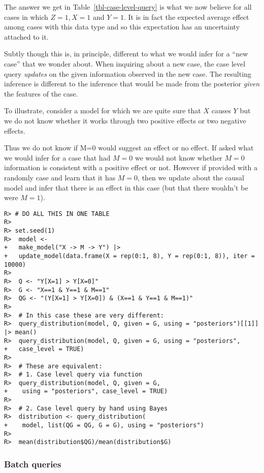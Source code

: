 \documentclass[
  11pt,
  article]{jss}
\begin{document}
The answer we get in Table~\ref{tbl-case-level-query} is what we now
believe for all cases in which \(Z=1, X=1\) and \(Y=1\). It is in fact
the expected average effect among cases with this data type and so this
expectation has an uncertainty attached to it.

Subtly though this is, in principle, different to what we would infer
for a ``new case'' that we wonder about. When inquiring about a new
case, the case level query \emph{updates} on the given information
observed in the new case. The resulting inference is different to the
inference that would be made from the posterior \emph{given} the
features of the case.

To illustrate, consider a model for which we are quite sure that \(X\)
causes \(Y\) but we do not know whether it works through two positive
effects or two negative effects.

Thus we do not know if M=0 would suggest an effect or no effect. If
asked what we would infer for a case that had \(M=0\) we would not know
whether \(M=0\) information is consistent with a positive effect or not.
However if provided with a randomly case and learn that it has \(M=0\),
then we update about the causal model and infer that there is an effect
in this case (but that there wouldn't be were \(M=1\)).

\begin{verbatim}
R> # DO ALL THIS IN ONE TABLE
R> 
R> set.seed(1)
R>  model <-
+   make_model("X -> M -> Y") |>
+   update_model(data.frame(X = rep(0:1, 8), Y = rep(0:1, 8)), iter = 10000)
R> 
R>  Q <- "Y[X=1] > Y[X=0]"
R>  G <- "X==1 & Y==1 & M==1"
R>  QG <- "(Y[X=1] > Y[X=0]) & (X==1 & Y==1 & M==1)"
R> 
R>  # In this case these are very different:
R>  query_distribution(model, Q, given = G, using = "posteriors")[[1]] |> mean()
R>  query_distribution(model, Q, given = G, using = "posteriors",
+   case_level = TRUE)
R> 
R>  # These are equivalent:
R>  # 1. Case level query via function
R>  query_distribution(model, Q, given = G,
+    using = "posteriors", case_level = TRUE)
R> 
R>  # 2. Case level query by hand using Bayes
R>  distribution <- query_distribution(
+    model, list(QG = QG, G = G), using = "posteriors")
R> 
R>  mean(distribution$QG)/mean(distribution$G)
\end{verbatim}

\hypertarget{batch-queries}{%
\subsubsection{Batch queries}\label{batch-queries}}
\end{document}
